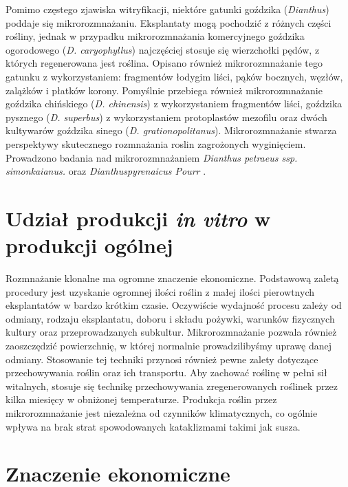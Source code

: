 \documentclass[two column, twoside, a4paper]{article}
\begin{document}
Pomimo częstego zjawiska witryfikacji, niektóre gatunki goździka (\textit{Dianthus}) poddaje się mikrorozmnażaniu. Eksplantaty mogą pochodzić z różnych części rośliny, jednak w przypadku mikrorozmnażania komercyjnego goździka ogorodowego (\textit{D. caryophyllus}) najczęściej stosuje się wierzchołki pędów, z których regenerowana jest roślina. Opisano również mikrorozmnażanie tego gatunku z wykorzystaniem: fragmentów łodygim liści, pąków bocznych, węzłów, zalążków i płatków korony. Pomyślnie przebiega również mikrorozmnażanie goździka chińskiego (\textit{D. chinensis}) z wykorzystaniem fragmentów liści, goździka pysznego (\textit{D. superbus}) z wykorzystaniem protoplastów mezofilu oraz dwóch kultywarów goździka sinego (\textit{D. grationopolitanus}). Mikrorozmnażanie stwarza perspektywy skutecznego rozmnażania roslin zagrożonych wyginięciem. Prowadzono badania nad mikrorozmnażaniem \textit{Dianthus petraeus ssp. simonkaianus.} oraz \textit{Dianthuspyrenaicus Pourr} \autocite{Fraga2004}.


\section{Udział produkcji \textit{in vitro} w produkcji ogólnej}

Rozmnażanie klonalne ma ogromne znaczenie ekonomiczne. Podstawową zaletą procedury jest uzyskanie ogromnej ilości roślin z małej ilości pierowtnych eksplantatów w bardzo krótkim czasie. Oczywiście wydajność procesu zależy od odmiany, rodzaju eksplantatu, doboru i składu pożywki, warunków fizycznych kultury oraz przeprowadzanych subkultur. Mikrorozmnażanie pozwala również zaoszczędzić powierzchnię, w której normalnie prowadzilibyśmy uprawę danej odmiany. Stosowanie tej techniki przynosi również pewne zalety dotyczące przechowywania roślin oraz ich transportu. Aby zachować roślinę w pełni sił witalnych, stosuje się technikę przechowywania zregenerowanych roślinek przez kilka miesięcy w obniżonej temperaturze.
Produkcja roślin przez mikrorozmnażanie jest niezależna od czynników klimatycznych, co ogólnie wpływa na brak strat spowodowanych kataklizmami takimi jak susza.

\section{Znaczenie ekonomiczne}
\end{document}
